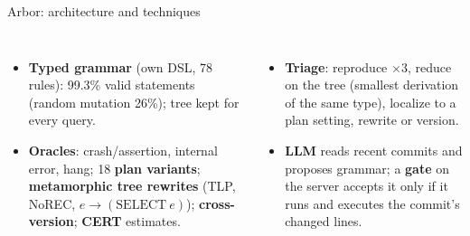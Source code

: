 \documentclass[aspectratio=169,10pt]{beamer}
\begin{document}
\begin{frame}{Arbor: architecture and techniques}
\centering\resizebox{0.9\linewidth}{!}{}
\scriptsize
\begin{columns}[T]
\begin{itemize}
  \item \textbf{Typed grammar} (own DSL, 78 rules): 99.3\% valid statements (random mutation 26\%); tree kept for every query.
  \item \textbf{Oracles}: crash/assertion, internal error, hang; 18 \textbf{plan variants}; \textbf{metamorphic tree rewrites} (TLP, NoREC, $e\rightarrow(\mathrm{SELECT}\ e)$); \textbf{cross-version}; \textbf{CERT} estimates.
\end{itemize}
\begin{itemize}
  \item \textbf{Triage}: reproduce $\times3$, reduce on the tree (smallest derivation of the same type), localize to a plan setting, rewrite or version.
  \item \textbf{LLM} reads recent commits and proposes grammar; a \textbf{gate} on the server accepts it only if it runs and executes the commit's changed lines.
\end{itemize}
\end{columns}
\end{frame}
\end{document}
